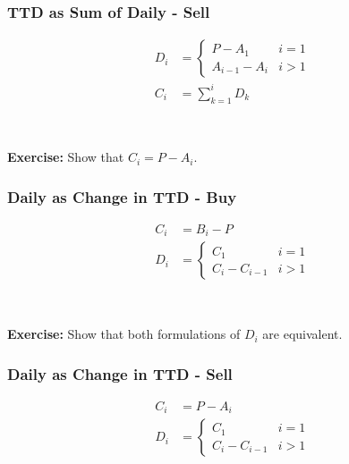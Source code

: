 \documentclass[11pt,]{krantz}
\begin{document}
\subsubsection*{TTD as Sum of Daily - Sell}\label{ttd-as-sum-of-daily---sell}

\begin{align*}
D_{i} &= \begin{cases} P - A_{1} & i = 1 \\ A_{i-1} - A_{i} & i > 1 \end{cases} \\[10pt]
C_{i} &= \sum_{k=1}^{i} D_{k}
\end{align*}

~

\textbf{Exercise:} Show that \(C_{i} = P - A_{i}\).

\subsubsection*{Daily as Change in TTD - Buy}\label{daily-as-change-in-ttd---buy}

\begin{align*}
C_{i} &= B_{i} - P \\[10pt]
D_{i} &= \begin{cases} C_{1} & i = 1 \\ C_{i} - C_{i-1} & i > 1 \end{cases}
\end{align*}

~

\textbf{Exercise:} Show that both formulations of \(D_{i}\) are equivalent.

\subsubsection*{Daily as Change in TTD - Sell}\label{daily-as-change-in-ttd---sell}

\begin{align*}
C_{i} &= P - A_{i} \\[10pt]
D_{i} &= \begin{cases} C_{1} & i = 1 \\ C_{i} - C_{i-1} & i > 1 \end{cases}
\end{align*}

~
\end{document}
